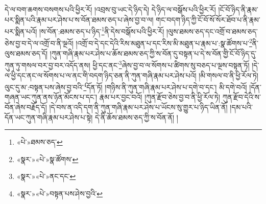 དེ་ལ་བག་ཆགས་བསགས་པའི་ཕྱིར་རོ། །འབྲས་བུ་ཡང་དེ་ཉིད་དེ། དེ་ཉིད་ལ་བསྒོས་པའི་ཕྱིར་རོ། །ངོ་བོ་ཉིད་ནི་རྣམ་པར་སྨིན་པའི་རྣམ་པར་ཤེས་པ་ས་བོན་ཐམས་ཅད་པ་ཞེས་བྱ་བ་ལ། གང་བདག་ཉིད་ཀྱི་ངོ་བོ་སོ་སོར་ཐོབ་པ་ནི་རྣམ་པར་སྨིན་པའོ། །ས་བོན་:ཐམས་ཅད་པ་ཉིད་\footnote{«པེ་»ཐམས་ཅད་}ནི་དེས་བསྒོས་པའི་ཕྱིར་རོ། །ལུས་ཐམས་ཅད་དང་འགྲོ་བ་ཐམས་ཅད་ཅེས་བྱ་བ་དེ་ལ་འགྲོ་བ་ནི་ལྔའོ། །འགྲོ་བ་དེ་དང་དེའི་རིས་མཐུན་པ་དང་རིས་མི་མཐུན་པ་རྣམ་པ་:སྣ་ཚོགས་པ་\footnote{«སྣར་»«པེ་»སྣ་ཚོགས་}ནི་ལུས་ཐམས་ཅད་དོ། །ཀུན་གཞི་རྣམ་པར་ཤེས་པ་ཆོས་ཐམས་ཅད་ཀྱི་ས་བོན་དུ་བསྟན་པ་དེ་ས་བོན་གྱི་ངོ་བོ་ཉིད་དུ་ཀུན་ཏུ་གསལ་བར་བྱ་བར་འདོད་ནས། ཕྱི་དང་ནང་\footnote{«སྣར་»«པེ་»ནང་དང་}ཞེས་བྱ་བ་ལ་སོགས་པ་ཚིགས་སུ་བཅད་པ་ལྔས་བསྟན་ཏོ། །དེ་ལ་ཕྱི་དང་ནང་ལ་སོགས་པ་ལ་ནང་གི་བདག་ཉིད་ཅན་ནི་ཀུན་གཞི་རྣམ་པར་ཤེས་པའོ། །མི་གསལ་བ་ནི་ཕྱི་རོལ་ཏེ། ལུང་དུ་མ་:བསྟན་པས་ཞེས་བྱ་བའི་\footnote{«སྣར་»«པེ་»བསྟན་པས་ཤེས་བྱའི་}དོན་ཏོ། །གཉིས་ནི་ཀུན་གཞི་རྣམ་པར་ཤེས་པ་དགེ་བ་དང་། མི་དགེ་བའོ། །དོན་གཞན་ཡང་ཀུན་ནས་ཉོན་མོངས་པ་དང་། རྣམ་པར་བྱང་བའོ། །ཀུན་རྫོབ་ཅེས་བྱ་བ་ནི་ཕྱི་རོལ་ཏེ། ཀུན་རྫོབ་དེའི་ས་བོན་ཞེས་བརྗོད་དོ། །དེ་བས་ན་འདི་དག་ནི་ཀུན་གཞི་རྣམ་པར་ཤེས་པ་ཡོངས་སུ་གྱུར་པ་ཉིད་ཡིན་ནོ། །དམ་པའི་དོན་ཡང་ཀུན་གཞི་རྣམ་པར་ཤེས་པ་སྟེ། དེ་ནི་ཆོས་ཐམས་ཅད་ཀྱི་ས་བོན་ནོ། །
